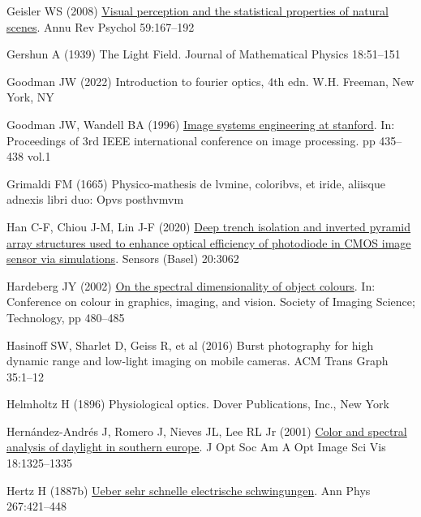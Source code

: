 \documentclass[
  letterpaper,
]{book}
\newlength{\cslhangindent}
\newenvironment{CSLReferences}[2] %
 {\begin{list}{}{%
  \setlength{\itemindent}{0pt}
  \setlength{\leftmargin}{0pt}
  \setlength{\parsep}{0pt}
  \ifodd #1
   \setlength{\leftmargin}{\cslhangindent}
   \setlength{\itemindent}{-1\cslhangindent}
  \fi
  \setlength{\itemsep}{#2\baselineskip}}}
 {\end{list}}
\begin{document}
\begin{CSLReferences}{1}{1}
Geisler WS (2008)
\href{http://dx.doi.org/10.1146/annurev.psych.58.110405.085632}{Visual
perception and the statistical properties of natural scenes}. Annu Rev
Psychol 59:167--192

Gershun A (1939) The {Light Field}. Journal of Mathematical Physics
18:51--151

Goodman JW (2022) Introduction to fourier optics, 4th edn. W.H. Freeman,
New York, NY

Goodman JW, Wandell BA (1996)
\href{https://doi.org/10.1109/ICIP.1996.559526}{Image systems
engineering at stanford}. In: Proceedings of 3rd IEEE international
conference on image processing. pp 435--438 vol.1

Grimaldi FM (1665) Physico-mathesis de lvmine, coloribvs, et iride,
aliisque adnexis libri duo: Opvs posthvmvm

Han C-F, Chiou J-M, Lin J-F (2020)
\href{http://dx.doi.org/10.3390/s20113062}{Deep trench isolation and
inverted pyramid array structures used to enhance optical efficiency of
photodiode in {CMOS} image sensor via simulations}. Sensors (Basel)
20:3062

Hardeberg JY (2002)
\href{https://library.imaging.org/cgiv/articles/1/1/art00101}{On the
spectral dimensionality of object colours}. In: Conference on colour in
graphics, imaging, and vision. Society of Imaging Science; Technology,
pp 480--485

Hasinoff SW, Sharlet D, Geiss R, et al (2016) Burst photography for high
dynamic range and low-light imaging on mobile cameras. ACM Trans Graph
35:1--12

Helmholtz H (1896) Physiological optics. Dover Publications, Inc., New
York

Hernández-Andrés J, Romero J, Nieves JL, Lee RL Jr (2001)
\href{https://colorimaginglab.ugr.es/pages/pdfs/josaa_2001_1325/\%21}{Color
and spectral analysis of daylight in southern europe}. J Opt Soc Am A
Opt Image Sci Vis 18:1325--1335

Hertz H (1887b) \href{http://dx.doi.org/10.1002/andp.18872670707}{Ueber
sehr schnelle electrische schwingungen}. Ann Phys 267:421--448


\end{CSLReferences}
\end{document}
